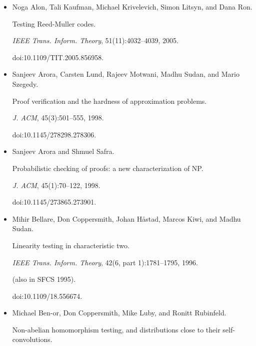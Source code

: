 \begin{itemize}


\item[] 
[1]

Noga Alon, Tali Kaufman, Michael Krivelevich, Simon Litsyn, and Dana Ron.


Testing Reed-Muller codes.


\emph{IEEE Trans. Inform. Theory}, 51(11):4032–4039, 2005.


doi:10.1109/TIT.2005.856958.





\item[] 
[2]

Sanjeev Arora, Carsten Lund, Rajeev Motwani, Madhu Sudan, and Mario Szegedy.


Proof verification and the hardness of approximation problems.


\emph{J. ACM}, 45(3):501–555, 1998.


doi:10.1145/278298.278306.





\item[] 
[3]

Sanjeev Arora and Shmuel Safra.


Probabilistic checking of proofs: a new characterization of NP.


\emph{J. ACM}, 45(1):70–122, 1998.


doi:10.1145/273865.273901.





\item[] 
[4]

Mihir Bellare, Don Coppersmith, Johan Håstad, Marcos Kiwi, and Madhu Sudan.


Linearity testing in characteristic two.


\emph{IEEE Trans. Inform. Theory}, 42(6, part 1):1781–1795, 1996.


(also in SFCS 1995).


doi:10.1109/18.556674.





\item[] 
[5]

Michael Ben-or, Don Coppersmith, Mike Luby, and Ronitt Rubinfeld.


Non-abelian homomorphism testing, and distributions close to their
self-convolutions.



\end{itemize}
